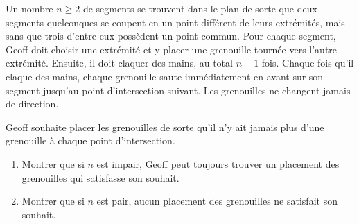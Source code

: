 Un nombre $n \geqslant 2$ de segments se trouvent dans le plan de sorte que deux segments quelconques se
coupent en un point différent de leurs extrémités, mais sans que trois d'entre eux possèdent un point commun.
Pour chaque segment, Geoff doit choisir une extrémité et y placer une grenouille tournée vers l'autre
extrémité. Ensuite, il doit claquer des mains, au total $n - 1$ fois. Chaque fois qu'il claque des mains,
chaque grenouille saute immédiatement en avant sur son segment jusqu'au point d'intersection suivant. Les
grenouilles ne changent jamais de direction.

Geoff souhaite placer les grenouilles de sorte qu'il n'y ait jamais plus d'une grenouille à chaque point
d'intersection.
\begin{enumerate}
  \item[(a)] Montrer que si $n$ est impair, Geoff peut toujours trouver un placement des grenouilles qui
  satisfasse son souhait.
  \item[(b)] Montrer que si $n$ est pair, aucun placement des grenouilles ne satisfait son souhait.
\end{enumerate}
